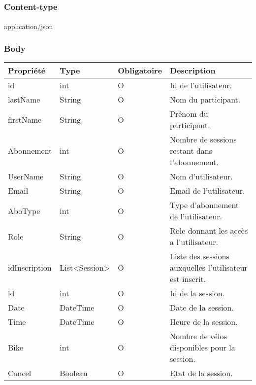 	\subsubsection{Content-type}
		\paragraph{}
			application/json
	
	\subsubsection{Body}
		\begin{center}
			\begin{tabularx}{\textwidth}{| T{0.2122\textwidth} | S{0.22\textwidth} | S{0.15\textwidth} | S{0.3\textwidth} |}
				\hline
				Propriété & Type & Obligatoire & Description \\
				\hline
				id & int & O & Id de l'utilisateur. \\
				\hline
				lastName & String & O & Nom du participant. \\
				\hline
				firstName & String & O & Prénom du participant. \\
				\hline
				Abonnement & int & O & Nombre de sessions restant dans l'abonnement. \\
				\hline
				UserName & String & O & Nom d'utilisateur. \\
				\hline
				Email & String & O & Email de l'utilisateur. \\
				\hline
				AboType & int & O & Type d'abonnement de l'utilisateur. \\
				\hline
				Role & String & O & Role donnant les accès a l'utilisateur. \\ 
				\hline
				idInscription & List<Session> & O & Liste des sessions auxquelles l'utilisateur est inscrit. \\
				\hline
				
				\hline
				
				\hline
				id & int & O & Id de la session. \\
				\hline
				Date & DateTime & O & Date de la session. \\
				\hline
				Time & DateTime & O & Heure de la session. \\
				\hline
				Bike & int & O & Nombre de vélos disponibles pour la session. \\
				\hline
				Cancel & Boolean & O & Etat de la session. \\
				\hline

			\end{tabularx}
		\end{center}
		
